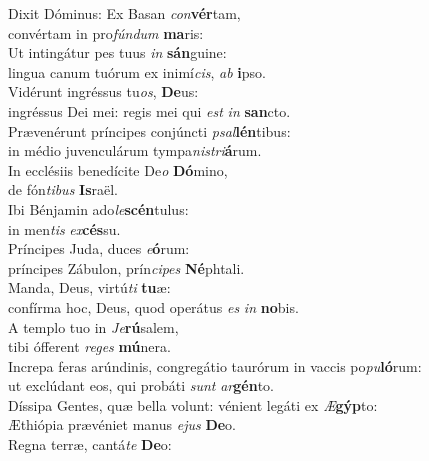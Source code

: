 \evenverse Dixit Dóminus: Ex Basan \textit{con}\textbf{vér}tam,~\*\\
\evenverse convértam in pro\textit{fún}\textit{dum} \textbf{ma}ris:\\
\oddverse Ut intingátur pes tuus \textit{in} \textbf{sán}guine:~\*\\
\oddverse lingua canum tuórum ex inimí\textit{cis}, \textit{ab} \textbf{i}pso.\\
\evenverse Vidérunt ingréssus tu\textit{os}, \textbf{De}us:~\*\\
\evenverse ingréssus Dei mei: regis mei qui \textit{est} \textit{in} \textbf{san}cto.\\
\oddverse Prævenérunt príncipes conjúncti \textit{psal}\textbf{lén}tibus:~\*\\
\oddverse in médio juvenculárum tympa\textit{ni}\textit{stri}\textbf{á}rum.\\
\evenverse In ecclésiis benedícite De\textit{o} \textbf{Dó}mino,~\*\\
\evenverse de fón\textit{ti}\textit{bus} \textbf{Is}raël.\\
\oddverse Ibi Bénjamin ado\textit{le}\textbf{scén}tulus:~\*\\
\oddverse in men\textit{tis} \textit{ex}\textbf{cés}su.\\
\evenverse Príncipes Juda, duces \textit{e}\textbf{ó}rum:~\*\\
\evenverse príncipes Zábulon, prín\textit{ci}\textit{pes} \textbf{Né}phtali.\\
\oddverse Manda, Deus, virtú\textit{ti} \textbf{tu}æ:~\*\\
\oddverse confírma hoc, Deus, quod operátus \textit{es} \textit{in} \textbf{no}bis.\\
\evenverse A templo tuo in \textit{Je}\textbf{rú}salem,~\*\\
\evenverse tibi ófferent \textit{re}\textit{ges} \textbf{mú}nera.\\
\oddverse Increpa feras arúndinis, congregátio taurórum in vaccis po\textit{pu}\textbf{ló}rum:~\*\\
\oddverse ut exclúdant eos, qui probáti \textit{sunt} \textit{ar}\textbf{gén}to.\\
\evenverse Díssipa Gentes, quæ bella volunt: vénient legáti ex \textit{Æ}\textbf{gýp}to:~\*\\
\evenverse Æthiópia prævéniet manus \textit{e}\textit{jus} \textbf{De}o.\\
\oddverse Regna terræ, cantá\textit{te} \textbf{De}o:~\*\\
